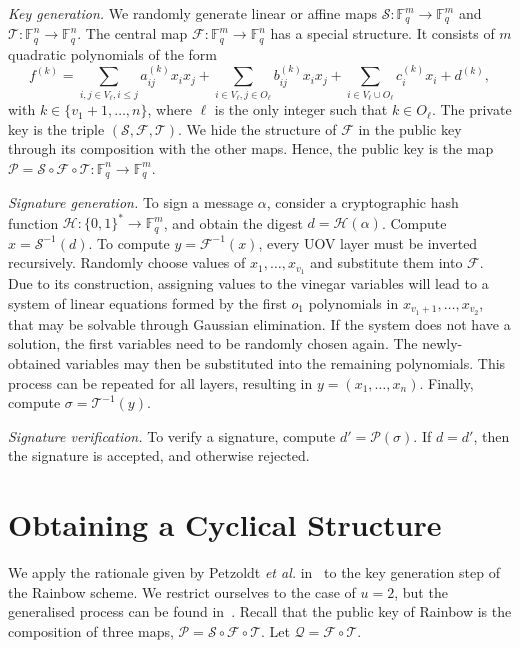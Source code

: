 \documentclass[a4paper, 14pt]{extarticle}
\begin{document}
\emph{Key generation.} We randomly generate linear or affine maps $\mathcal{S}: \mathbb{F}_{q}^{m} \rightarrow \mathbb{F}_{q}^{m}$ and $\mathcal{T}: \mathbb{F}_{q}^{n} \rightarrow \mathbb{F}_{q}^{n}$. The central map $\mathcal{F}: \mathbb{F}_{q}^{m} \rightarrow \mathbb{F}_{q}^{n}$
has a special structure. It consists of $m$ quadratic polynomials of the form
$$f^{(k)} = \sum_{i, j \in V_{\ell}, i \leq j} a_{ij}^{(k)} x_{i} x_{j}
        + \sum_{i \in V_{\ell}, j \in O_{\ell}} b_{ij}^{(k)} x_{i} x_{j}
        + \sum_{i \in V_{\ell} \cup O_{\ell}} c_{i}^{(k)} x_{i} + d^{(k)},$$
with $k \in \{v_{1} + 1, \dots, n\}$, where $\ell$ is the only integer such that $k \in O_{\ell}$. The private key is the triple $(\mathcal{S}, \mathcal{F}, \mathcal{T})$. We hide the structure of $\mathcal{F}$ in the public key through its composition with the other maps. Hence, the public key is the map $\mathcal{P} = \mathcal{S} \circ \mathcal{F} \circ \mathcal{T} : \mathbb{F}_{q}^{n} \rightarrow \mathbb{F}_{q}^{m}$.

\emph{Signature generation.} To sign a message $\alpha$, consider a cryptographic hash function $\mathcal{H} : \{0, 1\}^{*} \rightarrow \mathbb{F}_{q}^{m}$, and obtain the digest $d = \mathcal{H}(\alpha)$. Compute $x = \mathcal{S}^{-1}(d)$. To compute $y = \mathcal{F}^{-1}(x)$, every UOV layer must be inverted recursively. Randomly choose values of $x_{1}, \dots, x_{v_{1}}$ and substitute them into $\mathcal{F}$. Due to its construction, assigning values to the vinegar variables will lead to a system of linear equations formed by the first $o_{1}$ polynomials in $x_{v_{1} + 1}, \dots, x_{v_{2}}$, that may be solvable through Gaussian elimination. If the system does not have a solution, the first variables need to be randomly chosen again. The newly-obtained variables may then be substituted into the remaining polynomials. This process can be repeated for all layers, resulting in $y = (x_{1}, \dots, x_{n})$. Finally, compute $\sigma = \mathcal{T}^{-1}(y)$.

\emph{Signature verification.} To verify a signature, compute $d' = \mathcal{P}(\sigma)$. If $d = d'$, then the signature is accepted, and otherwise rejected.

\section{Obtaining a Cyclical Structure}\label{sec:cyclic}

We apply the rationale given by Petzoldt \emph{et al.} in~\cite{Petzoldt:inproc:2010:jun} to the key generation step of the Rainbow scheme. We restrict ourselves to the case of $u = 2$, but the generalised process can be found in~\cite[Section 7.2]{Petzoldt:phd:2013:jul}. Recall that the public key of Rainbow is the composition of three maps, $\mathcal{P} = \mathcal{S} \circ \mathcal{F} \circ \mathcal{T}$. Let $\mathcal{Q} = \mathcal{F} \circ \mathcal{T}$. 
\end{document}
